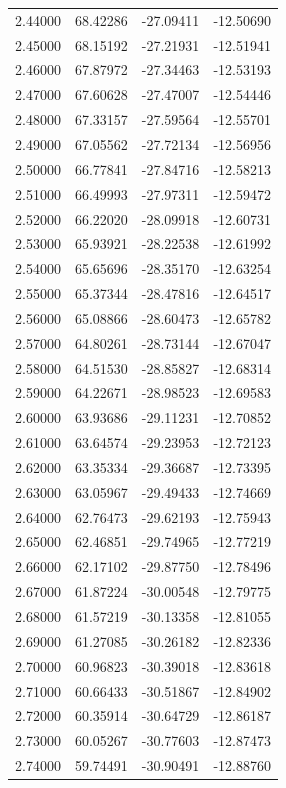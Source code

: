 \begin{table}
\begin{tabular}{llll}
2.44000 & 68.42286 & -27.09411 & -12.50690 \\
2.45000 & 68.15192 & -27.21931 & -12.51941 \\
2.46000 & 67.87972 & -27.34463 & -12.53193 \\
2.47000 & 67.60628 & -27.47007 & -12.54446 \\
2.48000 & 67.33157 & -27.59564 & -12.55701 \\
2.49000 & 67.05562 & -27.72134 & -12.56956 \\
2.50000 & 66.77841 & -27.84716 & -12.58213 \\
2.51000 & 66.49993 & -27.97311 & -12.59472 \\
2.52000 & 66.22020 & -28.09918 & -12.60731 \\
2.53000 & 65.93921 & -28.22538 & -12.61992 \\
2.54000 & 65.65696 & -28.35170 & -12.63254 \\
2.55000 & 65.37344 & -28.47816 & -12.64517 \\
2.56000 & 65.08866 & -28.60473 & -12.65782 \\
2.57000 & 64.80261 & -28.73144 & -12.67047 \\
2.58000 & 64.51530 & -28.85827 & -12.68314 \\
2.59000 & 64.22671 & -28.98523 & -12.69583 \\
2.60000 & 63.93686 & -29.11231 & -12.70852 \\
2.61000 & 63.64574 & -29.23953 & -12.72123 \\
2.62000 & 63.35334 & -29.36687 & -12.73395 \\
2.63000 & 63.05967 & -29.49433 & -12.74669 \\
2.64000 & 62.76473 & -29.62193 & -12.75943 \\
2.65000 & 62.46851 & -29.74965 & -12.77219 \\
2.66000 & 62.17102 & -29.87750 & -12.78496 \\
2.67000 & 61.87224 & -30.00548 & -12.79775 \\
2.68000 & 61.57219 & -30.13358 & -12.81055 \\
2.69000 & 61.27085 & -30.26182 & -12.82336 \\
2.70000 & 60.96823 & -30.39018 & -12.83618 \\
2.71000 & 60.66433 & -30.51867 & -12.84902 \\
2.72000 & 60.35914 & -30.64729 & -12.86187 \\
2.73000 & 60.05267 & -30.77603 & -12.87473 \\
2.74000 & 59.74491 & -30.90491 & -12.88760 \\

\end{tabular}
\end{table}
